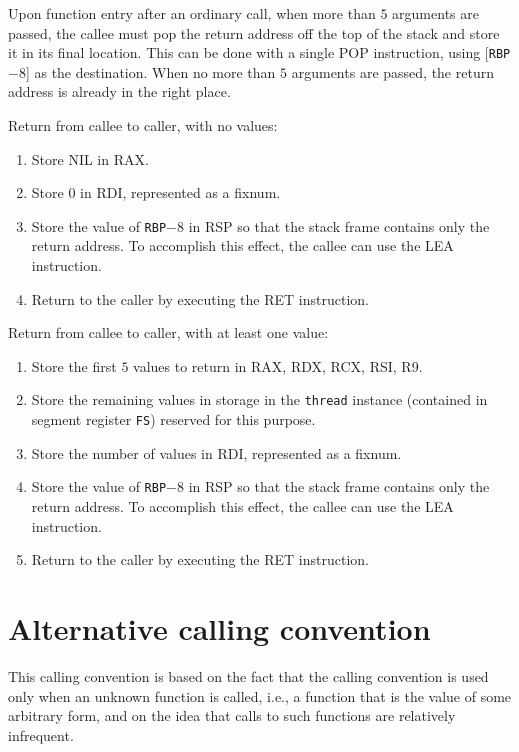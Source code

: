 Upon function entry after an ordinary call, when more than $5$
arguments are passed, the callee must pop the return address off the
top of the stack and store it in its final location.  This can be done
with a single POP instruction, using [\texttt{RBP}$ - 8$] as the
destination.  When no more than $5$ arguments are passed, the return
address is already in the right place.

Return from callee to caller, with no values:

\begin{enumerate}
\item Store NIL in RAX.
\item Store $0$ in RDI, represented as a fixnum.
\item Store the value of \texttt{RBP}$ - 8$ in RSP so that the stack frame
  contains only the return address.  To accomplish this effect, the
  callee can use the LEA instruction.
\item Return to the caller by executing the RET instruction.
\end{enumerate}

Return from callee to caller, with at least one value:

\begin{enumerate}
\item Store the first $5$ values to return in RAX, RDX, RCX, RSI, R9.
\item Store the remaining values in storage in the \texttt{thread}
  instance (contained in segment register \texttt{FS}) reserved for
  this purpose.
\item Store the number of values in RDI, represented as a fixnum.
\item Store the value of \texttt{RBP}$ - 8$ in RSP so that the stack frame
  contains only the return address.  To accomplish this effect, the
  callee can use the LEA instruction.
\item Return to the caller by executing the RET instruction.
\end{enumerate}

\section{Alternative calling convention}

This calling convention is based on the fact that the calling
convention is used only when an unknown function is called, i.e., a
function that is the value of some arbitrary form, and on the idea
that calls to such functions are relatively infrequent.

